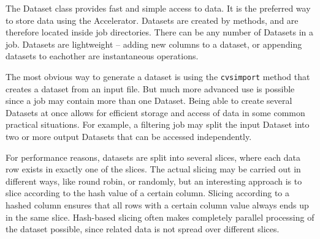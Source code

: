 
\label{chap:datasets}

The Dataset class provides fast and simple access to data.  It is the
preferred way to store data using the Accelerator.  Datasets are
created by methods, and are therefore located inside job directories.
There can be any number of Datasets in a job.  Datasets are
lightweight -- adding new columns to a dataset, or appending datasets
to eachother are instantaneous operations.

The most obvious way to generate a dataset is using the
\texttt{cvsimport} method that creates a dataset from an input file.
But much more advanced use is possible since a job may contain more
than one Dataset.  Being able to create several Datasets at once
allows for efficient storage and access of data in some common
practical situations.  For example, a filtering job may split the
input Dataset into two or more output Datasets that can be accessed
independently.

For performance reasons, datasets are split into several slices, where
each data row exists in exactly one of the slices.  The actual slicing
may be carried out in different ways, like round robin, or randomly,
but an interesting approach is to slice according to the hash value of
a certain column.  Slicing according to a hashed column ensures that
all rows with a certain column value always ends up in the same slice.
Hash-based slicing often makes completely parallel processing of the
dataset possible, since related data is not spread over different
slices.



